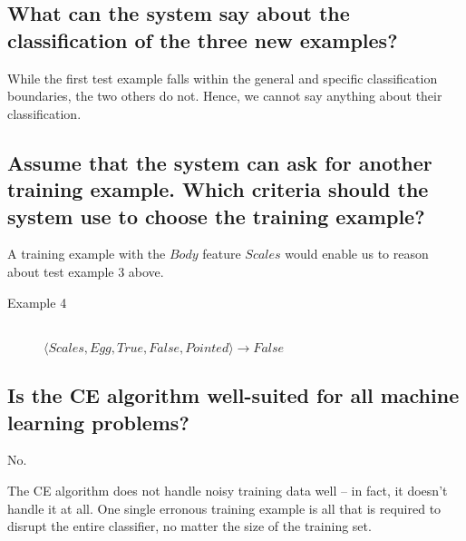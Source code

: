 \documentclass[11pt,a4paper]{article}
\begin{document}
    
    \subsection{What can the system say about the classification of the three new examples?} %
    \label{sub:what_can_the_system_say_about_the_classification_of_the_three_new_examples}
      
      While the first test example falls within the general and specific classification boundaries, the two others do not.
      Hence, we cannot say anything about their classification.
      
    
    \subsection{Assume that the system can ask for another training example. Which criteria should the system use to choose the training example?} %
    
      A training example with the $Body$ feature $Scales$ would enable us to reason about test example 3 above.
      
      \begin{description}
        \item[Example 4] \hfill \\
          $\langle Scales, Egg, True, False, Pointed \rangle \rightarrow False$
      \end{description}
    
    
    \subsection{Is the CE algorithm well-suited for all machine learning problems?} %
    \label{sub:is_the_ce_algorithm_well_suited_for_all_machine_learning_problems_}
    
      No.
      
      The CE algorithm does not handle noisy training data well -- in fact, it doesn't handle it at all.
      One single erronous training example is all that is required to disrupt the entire classifier, no matter the size of the training set.
    
  
\end{document}
